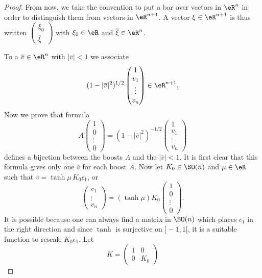\begin{proof}
	From now, we take the convention to put a bar over vectors in $\eR^n$ in order to distinguish them from vectors in $\eR^{n+1}$. A vector $\xi\in\eR^{n+1}$ is thus written
	$
		\begin{pmatrix}
			\xi_0 \\\overline{ \xi }
		\end{pmatrix}
	$ with $\xi_0\in\eR$ and $\overline{ \xi }\in\eR^n$.

	To a $\overline{ v }\in\eR^n$ with $| \overline{ v } |<1$ we associate
	\[
		(1-| \overline{ v } |^2)^{1/2}
		\begin{pmatrix}
			1 \\v_1\\\vdots\\v_n
		\end{pmatrix}
		\in\eR^{n+1}.
	\]
	Now we prove that formula
	\begin{equation}
		A
		\begin{pmatrix}
			1 \\0\\\vdots\\0
		\end{pmatrix}
		=(1-|\overline{ v }|^2)^{-1/2}
		\begin{pmatrix}
			1 \\v_1\\\vdots \\v_n
		\end{pmatrix}
	\end{equation}
	defines a bijection between the boosts $A$ and the $|\overline{ v }|<1$. It is first clear that this formula gives only one $\overline{v}$ for each boost $A$. Now let $K_0\in \SO(n)$ and $\mu\in\eR$ such that $\overline{v}=\tanh\mu\,K_0\epsilon_1$, or
	\[
		\begin{pmatrix}
			v_1 \\\vdots\\v_n
		\end{pmatrix}
		=
		(\tanh\mu)K_0
		\begin{pmatrix}
			1 \\0\\\vdots\\0
		\end{pmatrix}.
	\]
	It is possible because one can always find a matrix in $\SO(n)$ which places $\epsilon_1$ in the right direction and since $\tanh$ is surjective on $]-1,1[$, it is a suitable function to rescale $K_0\epsilon_1$. Let
	\[
		K=
		\begin{pmatrix}
			1 & 0 \\0&K_0

\end{pmatrix}\]
\end{proof}

